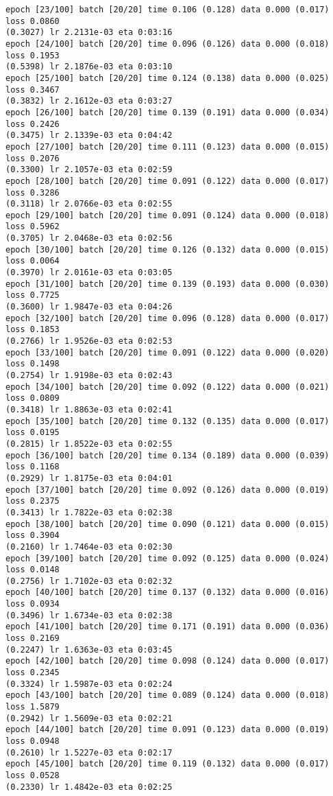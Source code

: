 \documentclass[11pt]{article}
\begin{document}
\begin{Verbatim}[commandchars=\\\{\}]
epoch [23/100] batch [20/20] time 0.106 (0.128) data 0.000 (0.017) loss 0.0860
(0.3027) lr 2.2131e-03 eta 0:03:16
epoch [24/100] batch [20/20] time 0.096 (0.126) data 0.000 (0.018) loss 0.1953
(0.5398) lr 2.1876e-03 eta 0:03:10
epoch [25/100] batch [20/20] time 0.124 (0.138) data 0.000 (0.025) loss 0.3467
(0.3832) lr 2.1612e-03 eta 0:03:27
epoch [26/100] batch [20/20] time 0.139 (0.191) data 0.000 (0.034) loss 0.2426
(0.3475) lr 2.1339e-03 eta 0:04:42
epoch [27/100] batch [20/20] time 0.111 (0.123) data 0.000 (0.015) loss 0.2076
(0.3300) lr 2.1057e-03 eta 0:02:59
epoch [28/100] batch [20/20] time 0.091 (0.122) data 0.000 (0.017) loss 0.3286
(0.3118) lr 2.0766e-03 eta 0:02:55
epoch [29/100] batch [20/20] time 0.091 (0.124) data 0.000 (0.018) loss 0.5962
(0.3705) lr 2.0468e-03 eta 0:02:56
epoch [30/100] batch [20/20] time 0.126 (0.132) data 0.000 (0.015) loss 0.0064
(0.3970) lr 2.0161e-03 eta 0:03:05
epoch [31/100] batch [20/20] time 0.139 (0.193) data 0.000 (0.030) loss 0.7725
(0.3600) lr 1.9847e-03 eta 0:04:26
epoch [32/100] batch [20/20] time 0.096 (0.128) data 0.000 (0.017) loss 0.1853
(0.2766) lr 1.9526e-03 eta 0:02:53
epoch [33/100] batch [20/20] time 0.091 (0.122) data 0.000 (0.020) loss 0.1498
(0.2754) lr 1.9198e-03 eta 0:02:43
epoch [34/100] batch [20/20] time 0.092 (0.122) data 0.000 (0.021) loss 0.0809
(0.3418) lr 1.8863e-03 eta 0:02:41
epoch [35/100] batch [20/20] time 0.132 (0.135) data 0.000 (0.017) loss 0.0195
(0.2815) lr 1.8522e-03 eta 0:02:55
epoch [36/100] batch [20/20] time 0.134 (0.189) data 0.000 (0.039) loss 0.1168
(0.2929) lr 1.8175e-03 eta 0:04:01
epoch [37/100] batch [20/20] time 0.092 (0.126) data 0.000 (0.019) loss 0.2375
(0.3413) lr 1.7822e-03 eta 0:02:38
epoch [38/100] batch [20/20] time 0.090 (0.121) data 0.000 (0.015) loss 0.3904
(0.2160) lr 1.7464e-03 eta 0:02:30
epoch [39/100] batch [20/20] time 0.092 (0.125) data 0.000 (0.024) loss 0.0148
(0.2756) lr 1.7102e-03 eta 0:02:32
epoch [40/100] batch [20/20] time 0.137 (0.132) data 0.000 (0.016) loss 0.0934
(0.3496) lr 1.6734e-03 eta 0:02:38
epoch [41/100] batch [20/20] time 0.171 (0.191) data 0.000 (0.036) loss 0.2169
(0.2247) lr 1.6363e-03 eta 0:03:45
epoch [42/100] batch [20/20] time 0.098 (0.124) data 0.000 (0.017) loss 0.2345
(0.3324) lr 1.5987e-03 eta 0:02:24
epoch [43/100] batch [20/20] time 0.089 (0.124) data 0.000 (0.018) loss 1.5879
(0.2942) lr 1.5609e-03 eta 0:02:21
epoch [44/100] batch [20/20] time 0.091 (0.123) data 0.000 (0.019) loss 0.0948
(0.2610) lr 1.5227e-03 eta 0:02:17
epoch [45/100] batch [20/20] time 0.119 (0.132) data 0.000 (0.017) loss 0.0528
(0.2330) lr 1.4842e-03 eta 0:02:25

\end{Verbatim}
\end{document}
